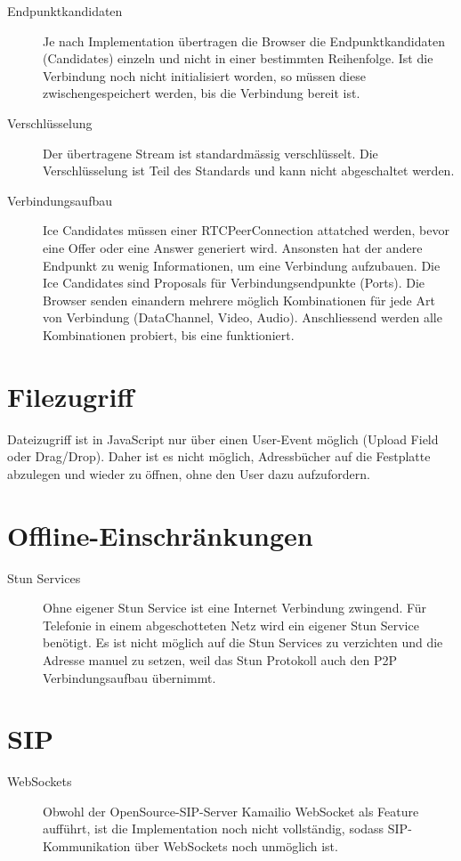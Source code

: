 	 	\begin{description}
			\item[Endpunktkandidaten] Je nach Implementation übertragen die Browser die Endpunktkandidaten (Candidates) einzeln und nicht in einer bestimmten Reihenfolge. Ist die Verbindung noch nicht initialisiert worden, so müssen diese zwischengespeichert werden, bis die Verbindung bereit ist.

			\item[Verschlüsselung] Der übertragene Stream ist standardmässig verschlüsselt. Die Verschlüsselung ist Teil des Standards und kann nicht abgeschaltet werden.
			
			\item[Verbindungsaufbau] Ice Candidates müssen einer RTCPeerConnection attatched werden, bevor eine Offer oder eine Answer generiert wird. Ansonsten hat der andere Endpunkt zu wenig Informationen, um eine Verbindung aufzubauen. Die Ice Candidates sind Proposals für Verbindungsendpunkte (Ports). Die Browser senden einandern mehrere möglich Kombinationen für jede Art von Verbindung (DataChannel, Video, Audio). Anschliessend werden alle Kombinationen probiert, bis eine funktioniert.
	 	\end{description}
	 
	 \section{Filezugriff}
	 	Dateizugriff ist in JavaScript nur über einen User-Event möglich (Upload
	 	Field oder Drag/Drop). Daher ist es nicht möglich, Adressbücher auf die
	 	Festplatte abzulegen und wieder zu öffnen, ohne den User dazu aufzufordern.
	 	
	 
	 \section{Offline-Einschränkungen}
	 	\begin{description}
			\item[Stun Services] Ohne eigener Stun Service ist eine Internet Verbindung zwingend. Für Telefonie in einem abgeschotteten Netz wird ein eigener Stun Service benötigt. Es ist nicht möglich auf die Stun Services zu verzichten und die Adresse manuel zu setzen, weil das Stun Protokoll auch den P2P Verbindungsaufbau übernimmt.
	 	\end{description}
	 		
	 \section{SIP}
	 	\begin{description}
			\item[WebSockets] Obwohl der OpenSource-SIP-Server Kamailio WebSocket als Feature aufführt,
	 		ist die Implementation noch nicht vollständig, sodass SIP-Kommunikation über
	 		WebSockets noch unmöglich ist.
	 	\end{description}
	 		
